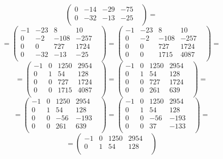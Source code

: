 \documentclass[a4paper,12pt]{article}
\begin{document}
\begin{enumerate}
\[\begin{pmatrix}
0 & -14 & -29 & -75 & \\
0 & -32 & -13 & -25 & \\
\end{pmatrix}
=
\]
\[
=
\begin{pmatrix}
-1 & -23 & 8 & 10 & \\
0 & -2 & -108 & -257 & \\
0 & 0 & 727 & 1724 & \\
0 & -32 & -13 & -25 & \\
\end{pmatrix}
=
\begin{pmatrix}
-1 & -23 & 8 & 10 & \\
0 & -2 & -108 & -257 & \\
0 & 0 & 727 & 1724 & \\
0 & 0 & 1715 & 4087 & \\
\end{pmatrix}
=
\]
\[
=
\begin{pmatrix}
-1 & 0 & 1250 & 2954 & \\
0 & 1 & 54 & 128 & \\
0 & 0 & 727 & 1724 & \\
0 & 0 & 1715 & 4087 & \\
\end{pmatrix}
=
\begin{pmatrix}
-1 & 0 & 1250 & 2954 & \\
0 & 1 & 54 & 128 & \\
0 & 0 & 727 & 1724 & \\
0 & 0 & 261 & 639 & \\
\end{pmatrix}
=
\]
\[
=
\begin{pmatrix}
-1 & 0 & 1250 & 2954 & \\
0 & 1 & 54 & 128 & \\
0 & 0 & -56 & -193 & \\
0 & 0 & 261 & 639 & \\
\end{pmatrix}
=
\begin{pmatrix}
-1 & 0 & 1250 & 2954 & \\
0 & 1 & 54 & 128 & \\
0 & 0 & -56 & -193 & \\
0 & 0 & 37 & -133 & \\
\end{pmatrix}
=
\]
\[
=
\begin{pmatrix}
-1 & 0 & 1250 & 2954 & \\
0 & 1 & 54 & 128 & \\

\end{pmatrix}\]
\end{enumerate}
\end{document}
